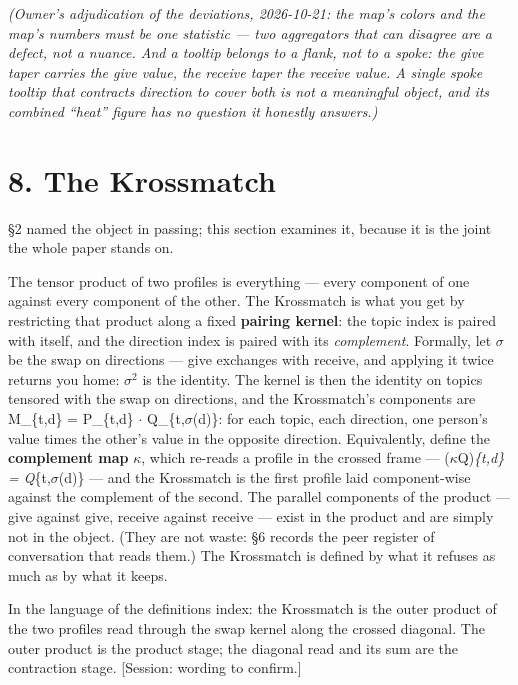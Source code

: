 \emph{(Owner's adjudication of the deviations, 2026-10-21: the map's
colors and the map's numbers must be one statistic --- two aggregators
that can disagree are a defect, not a nuance. And a tooltip belongs to a
flank, not to a spoke: the give taper carries the give value, the
receive taper the receive value. A single spoke tooltip that contracts
direction to cover both is not a meaningful object, and its combined
``heat'' figure has no question it honestly answers.)}

\section{8. The Krossmatch}\label{the-krossmatch}

\S 2 named the object in passing; this section examines it, because it is
the joint the whole paper stands on.

The tensor product of two profiles is everything --- every component of
one against every component of the other. The Krossmatch is what you get
by restricting that product along a fixed \textbf{pairing kernel}: the
topic index is paired with itself, and the direction index is paired
with its \emph{complement}. Formally, let $\sigma$ be the swap on directions
--- give exchanges with receive, and applying it twice returns you home:
$\sigma^2$ is the identity. The kernel is then the identity on topics tensored
with the swap on directions, and the Krossmatch's components are
M\_\{t,d\} = P\_\{t,d\} $\cdot$ Q\_\{t,$\sigma$(d)\}: for each topic, each direction,
one person's value times the other's value in the opposite direction.
Equivalently, define the \textbf{complement map} $\kappa$, which re-reads a
profile in the crossed frame --- ($\kappa$Q)\emph{\{t,d\} = Q}\{t,$\sigma$(d)\} ---
and the Krossmatch is the first profile laid component-wise against the
complement of the second. The parallel components of the product ---
give against give, receive against receive --- exist in the product and
are simply not in the object. (They are not waste: \S 6 records the peer
register of conversation that reads them.) The Krossmatch is defined by
what it refuses as much as by what it keeps.

In the language of the definitions index: the Krossmatch is the outer
product of the two profiles read through the swap kernel along the
crossed diagonal. The outer product is the product stage; the diagonal
read and its sum are the contraction stage. {[}Session: wording to
confirm.{]}

